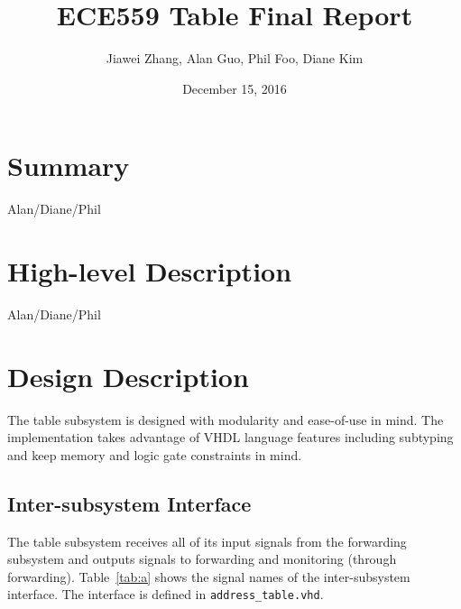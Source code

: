\documentclass{article}
\title{ECE559 Table Final Report}
\author{Jiawei Zhang, Alan Guo, Phil Foo, Diane Kim }
\date{December 15, 2016}
\begin{document}
\maketitle

\section{Summary}

Alan/Diane/Phil

\section{High-level Description}

Alan/Diane/Phil

\section{Design Description}

The table subsystem is designed with modularity and ease-of-use in mind. The implementation takes advantage of VHDL language features including subtyping and keep memory and logic gate constraints in mind. 

\subsection{Inter-subsystem Interface}

The table subsystem receives all of its input signals from the forwarding subsystem and outputs signals to forwarding and monitoring (through forwarding). Table~\ref{tab:a} shows the signal names of the inter-subsystem interface. The interface is defined in \texttt{address\_table.vhd}.
\end{document}

